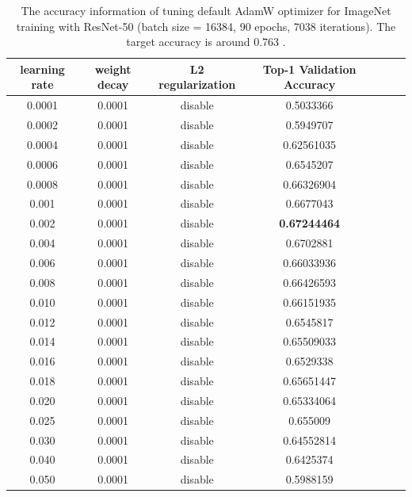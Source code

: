 \begin{table}[ht]
\renewcommand{\arraystretch}{1.3}
\caption{The accuracy information of tuning default AdamW optimizer for ImageNet training with ResNet-50 (batch size = 16384, 90 epochs, 7038 iterations). The target accuracy is around 0.763 \citep{goyal2017accurate}.}
\centering
\begin{tabular}{|c|c|c|c|c|c|c|}
\hline
learning rate & weight decay & L2 regularization & Top-1 Validation Accuracy\\
\hline
\hline
0.0001 & 0.0001 & disable & 0.5033366 \\
\hline
0.0002 & 0.0001 & disable & 0.5949707 \\
\hline
0.0004 & 0.0001 & disable & 0.62561035 \\
\hline
0.0006 & 0.0001 & disable & 0.6545207 \\
\hline
0.0008 & 0.0001 & disable & 0.66326904 \\
\hline
0.001 & 0.0001 & disable & 0.6677043 \\
\hline
0.002 & 0.0001 & disable & {\bf 0.67244464} \\
\hline
0.004 & 0.0001 & disable & 0.6702881 \\
\hline
0.006 & 0.0001 & disable & 0.66033936 \\
\hline
0.008 & 0.0001 & disable & 0.66426593 \\
\hline
0.010 & 0.0001 & disable & 0.66151935 \\
\hline
0.012 & 0.0001 & disable & 0.6545817 \\
\hline
0.014 & 0.0001 & disable & 0.65509033 \\
\hline
0.016 & 0.0001 & disable & 0.6529338 \\
\hline
0.018 & 0.0001 & disable & 0.65651447 \\
\hline
0.020 & 0.0001 & disable & 0.65334064 \\
\hline
0.025 & 0.0001 & disable & 0.655009 \\
\hline
0.030 & 0.0001 & disable & 0.64552814 \\
\hline
0.040 & 0.0001 & disable & 0.6425374 \\
\hline
0.050 & 0.0001 & disable & 0.5988159 \\
\hline
\end{tabular}
\label{table:imagenet_adamw_default_2}
\end{table}

